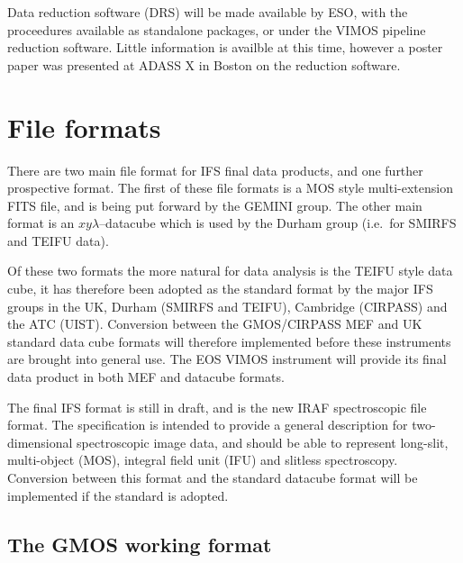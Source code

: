 \documentclass[twoside,11pt]{article}
\newcommand{\htmladdnormallink}[2]{#1}
\newcommand{\htmlref}[2]{#1}
\newcommand{\xlabel}[1]{}
\begin{document}
Data reduction software (DRS) will be made available by ESO, with the proceedures available as standalone packages, or under the VIMOS pipeline reduction software. Little information is availble at this time, however a poster paper was presented at \htmladdnormallink{ADASS X}{http://www.adass.org/} in Boston on the \htmladdnormallink{reduction software}{http://hea-www.harvard.edu/adass/Abstracts/html/179.html}.

\section{\xlabel{sc16_fileformat}File formats\label{sc16_fileformat}}

There are two main file format for IFS final data products, and one further prospective format. The \htmlref{first}{sc16_gmosfile} of these file formats is a MOS style multi-extension FITS file, and is being put forward by the GEMINI group. The other main format is an $xy\lambda$--\htmlref{datacube}{sc16_teifufile} which is used by the Durham group (i.e.\ for SMIRFS and TEIFU data). 

Of these two formats the more natural for data analysis is the TEIFU style data cube, it has therefore been adopted as the standard format by the major IFS groups in the UK, Durham (SMIRFS and TEIFU), Cambridge (CIRPASS) and the ATC (UIST). \htmlref{Conversion}{sc16_mef2cub} between the GMOS/CIRPASS MEF and UK standard data cube formats will therefore implemented before these instruments are brought into general use. The EOS VIMOS instrument will provide its final data product in both MEF and datacube formats.

The final IFS format is still in draft, and is the new IRAF spectroscopic \htmladdnormallink{file format}{sc16_iraf}. The specification is intended to provide a general description for two-dimensional spectroscopic image data, and should be able to represent long-slit, multi-object (MOS), integral field unit (IFU) and slitless spectroscopy. Conversion between this format and the standard datacube format will be implemented if the standard is adopted.

\subsection{\xlabel{sc16_gmosfile}The GMOS working format\label{sc16_gmosfile}}
\end{document}

